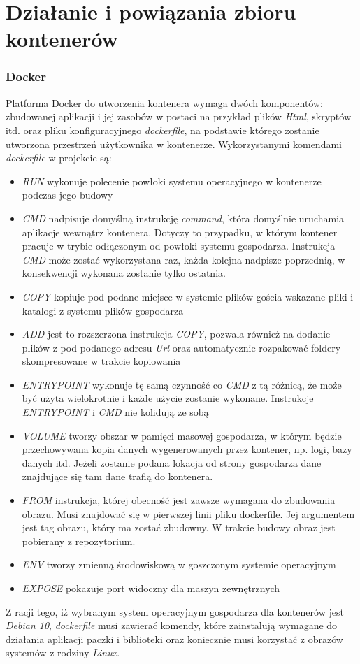 \documentclass[polish, a4paper, 12pt, oneside]{book}
\begin{document}
	\section{Działanie i powiązania zbioru kontenerów}
	\subsubsection{Docker}
	Platforma Docker do utworzenia kontenera wymaga dwóch komponentów: zbudowanej aplikacji i jej zasobów w postaci na przykład plików \textit{Html}, skryptów itd. oraz pliku konfiguracyjnego \textit{dockerfile}, na podstawie którego zostanie utworzona przestrzeń użytkownika w kontenerze. Wykorzystanymi komendami \textit{dockerfile} w projekcie są:
	\begin{itemize}[noitemsep]
		\item \textit{RUN} wykonuje polecenie powłoki systemu operacyjnego w kontenerze podczas jego budowy
		\item \textit{CMD} nadpisuje domyślną instrukcję \textit{command}, która domyślnie uruchamia aplikacje wewnątrz kontenera. Dotyczy to przypadku, w którym kontener pracuje w trybie odłączonym od powłoki systemu gospodarza. Instrukcja \textit{CMD} może zostać wykorzystana raz, każda kolejna nadpisze poprzednią, w konsekwencji wykonana zostanie tylko ostatnia.
		\item \textit{COPY} kopiuje pod podane miejsce w systemie plików gościa wskazane pliki i katalogi z systemu plików gospodarza
		\item \textit{ADD} jest to rozszerzona instrukcja \textit{COPY}, pozwala również na dodanie plików z pod podanego adresu \textit{Url} oraz automatycznie rozpakować foldery skompresowane w trakcie kopiowania
		\item \textit{ENTRYPOINT} wykonuje tę samą czynność co \textit{CMD} z tą różnicą, że może być użyta wielokrotnie i każde użycie zostanie wykonane. Instrukcje \textit{ENTRYPOINT} i \textit{CMD} nie kolidują ze sobą
		\item \textit{VOLUME} tworzy obszar w pamięci masowej gospodarza, w którym będzie przechowywana kopia danych wygenerowanych przez kontener, np. logi, bazy danych itd. Jeżeli zostanie podana lokacja od strony gospodarza dane znajdujące się tam dane trafią do kontenera.
		\item \textit{FROM} instrukcja, której obecność jest zawsze wymagana do zbudowania obrazu. Musi znajdować się w pierwszej linii pliku dockerfile. Jej argumentem jest tag obrazu, który ma zostać zbudowny. W trakcie budowy obraz jest pobierany z repozytorium.
		\item \textit{ENV} tworzy zmienną środowiskową w goszczonym systemie operacyjnym
		\item \textit{EXPOSE} pokazuje port widoczny dla maszyn zewnętrznych
	\end{itemize}
	Z racji tego, iż wybranym system operacyjnym gospodarza dla kontenerów jest \textit{Debian 10}\cite{debian10}, \textit{dockerfile} musi zawierać komendy, które zainstalują wymagane do działania aplikacji paczki i biblioteki oraz koniecznie musi korzystać z obrazów systemów z rodziny \textit{Linux}.
\end{document}
